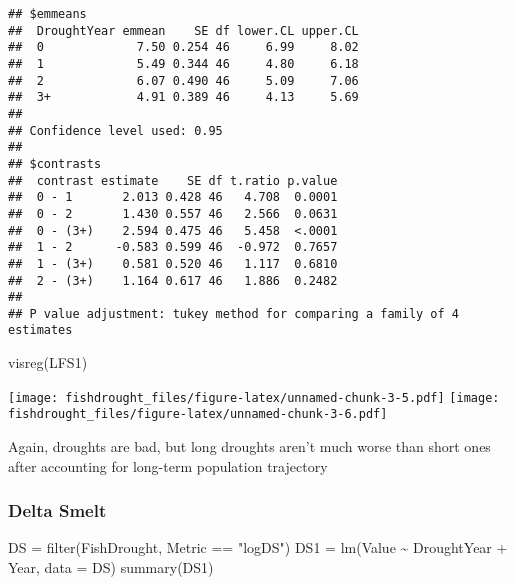 \documentclass[
]{article}
\newenvironment{Shaded}{\begin{snugshade}}{\end{snugshade}}
\newcommand{\AttributeTok}[1]{\textcolor[rgb]{0.77,0.63,0.00}{#1}}
\newcommand{\FunctionTok}[1]{\textcolor[rgb]{0.00,0.00,0.00}{#1}}
\newcommand{\NormalTok}[1]{#1}
\newcommand{\OtherTok}[1]{\textcolor[rgb]{0.56,0.35,0.01}{#1}}
\newcommand{\SpecialCharTok}[1]{\textcolor[rgb]{0.00,0.00,0.00}{#1}}
\newcommand{\StringTok}[1]{\textcolor[rgb]{0.31,0.60,0.02}{#1}}
\begin{document}
\begin{verbatim}
## $emmeans
##  DroughtYear emmean    SE df lower.CL upper.CL
##  0             7.50 0.254 46     6.99     8.02
##  1             5.49 0.344 46     4.80     6.18
##  2             6.07 0.490 46     5.09     7.06
##  3+            4.91 0.389 46     4.13     5.69
## 
## Confidence level used: 0.95 
## 
## $contrasts
##  contrast estimate    SE df t.ratio p.value
##  0 - 1       2.013 0.428 46   4.708  0.0001
##  0 - 2       1.430 0.557 46   2.566  0.0631
##  0 - (3+)    2.594 0.475 46   5.458  <.0001
##  1 - 2      -0.583 0.599 46  -0.972  0.7657
##  1 - (3+)    0.581 0.520 46   1.117  0.6810
##  2 - (3+)    1.164 0.617 46   1.886  0.2482
## 
## P value adjustment: tukey method for comparing a family of 4 estimates
\end{verbatim}

\begin{Shaded}
\begin{Highlighting}[]
\FunctionTok{visreg}\NormalTok{(LFS1)}
\end{Highlighting}
\end{Shaded}

\texttt{[image: fishdrought\_files/figure-latex/unnamed-chunk-3-5.pdf]}
\texttt{[image: fishdrought\_files/figure-latex/unnamed-chunk-3-6.pdf]}

Again, droughts are bad, but long droughts aren't much worse than short
ones after accounting for long-term population trajectory

\hypertarget{delta-smelt}{%
\subsubsection{Delta Smelt}\label{delta-smelt}}

\begin{Shaded}
\begin{Highlighting}[]
\NormalTok{DS }\OtherTok{=} \FunctionTok{filter}\NormalTok{(FishDrought, Metric }\SpecialCharTok{==} \StringTok{"logDS"}\NormalTok{)}
\NormalTok{DS1 }\OtherTok{=} \FunctionTok{lm}\NormalTok{(Value }\SpecialCharTok{\textasciitilde{}}\NormalTok{ DroughtYear }\SpecialCharTok{+}\NormalTok{ Year, }\AttributeTok{data =}\NormalTok{ DS)}
\FunctionTok{summary}\NormalTok{(DS1)}
\end{Highlighting}
\end{Shaded}
\end{document}
